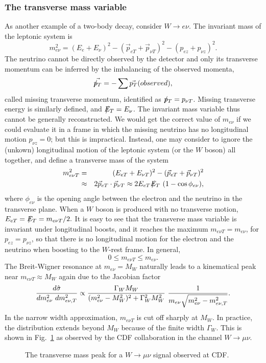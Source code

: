 \documentclass[12pt,prd,aps,floats,preprintnumbers,preprint,superscriptaddress,floatfix,nofootinbib]{revtex4}
\newcommand{ \slashchar }[1]{\setbox0=\hbox{$#1$}   %
   \dimen0=\wd0                                     %
   \setbox1=\hbox{/} \dimen1=\wd1                   %
   \ifdim\dimen0>\dimen1                            %
      \rlap{\hbox to \dimen0{\hfil/\hfil}}          %
      #1                                            %
   \else                                            %
      \rlap{\hbox to \dimen1{\hfil$#1$\hfil}}       %
      /                                             %
   \fi}                                             %
\def\ptmiss{\slashchar{p}_{T}}
\def\etmiss{\slashchar{E}_{T}}
\def\be{\begin{equation}}
\def\ee{\end{equation}}
\def\bea{\begin{eqnarray}}
\def\eea{\end{eqnarray}}
\begin{document}
\subsubsection{The transverse mass variable}

As another example of a two-body decay, consider  $W \to e\nu$.
The invariant mass of the leptonic system is
\be 
 m_{e\nu}^2 = (E_e + E_\nu)^2 - (\vec p_{eT} + \vec p_{\nu T})^2 
 - (p_{ez} + p_{\nu z})^2.
\ee
The neutrino cannot be directly observed by the detector and only
its transverse momentum can be inferred by the imbalancing 
of the observed momenta, 
\be
\vec{\ptmiss} = -\sum \vec {p_T}(observed), 
\ee
called missing transverse momentum, identified as 
$\ptmiss=p_{\nu T}$. Missing transverse energy is similarly defined,
and $\etmiss=E_\nu$. The invariant mass variable
thus cannot be generally reconstructed. We would get the correct value
of $m_{e\nu}$ if we could evaluate it in a frame in which
the missing neutrino has no longitudinal motion $p_{\nu z}=0$; but
this is impractical. Instead, one may consider to ignore the (unkown)
longitudinal motion of the leptonic system (or the $W$ boson) all
together, and define a transverse mass of the system \cite{MT}
\bea
 m_{e\nu T}^2 &=& (E_{eT} + E_{\nu T})^2 - (\vec p_{eT} + \vec p_{\nu T})^2 \\
&\approx& 2 \vec p_{eT} \cdot \vec p_{\nu T} \approx  2E_{eT} \etmiss\  (1-\cos\phi_{e\nu}),
\nonumber
\eea
where $\phi_{e\nu}$ is the opening angle between the electron and the neutrino
in the transverse plane. 
When a $W$ boson is produced with no transverse motion, 
 $E_{eT}= \etmiss = m_{e\nu T}/2.$
%
It is easy to see that the transverse mass variable is invariant under 
longitudinal boosts, and it reaches the maximum  $m_{e\nu T} = m_{e\nu}$, 
for $p_{ez} = p_{\nu z}$, so
that there is no longitudinal motion for the electron and the neutrino when
boosting to  the $W$-rest frame. In general, 
\be
0 \le m_{e\nu T} \le m_{e\nu} .
\ee
The Breit-Wigner resonance at $ m_{e\nu} = M_W$ naturally leads to
a kinematical peak near $m_{e\nu T} \approx M_W$ again due to the Jacobian
factor 
\be
{d\hat\sigma\over dm_{e\nu}^2\ dm^2_{e\nu, T} } \propto
\frac{\Gamma_WM_W}{ (m^2_{e\nu}-M^2_W)^2 + \Gamma_W^2 M_W^2}\ 
{ 1 \over m_{e\nu} \sqrt{ m_{e\nu}^2-m_{e\nu, T}^2}} .
\ee
In the narrow width approximation, $m_{e\nu T}$ is cut off sharply at  $M_W$.
In practice, the distribution extends beyond $M_W$ because of the finite
width $\Gamma_W$. This is shown in Fig.~\ref{MTW} 
as observed by the CDF collaboration \cite{cdf}
in the channel  $W\to \mu\nu$.
\begin{center}
\begin{figure}[tb]
\caption{The transverse mass peak for a $W\to \mu\nu$ signal 
observed at CDF.}
\label{MTW}
\end{figure}
\end{center}
\end{document}
